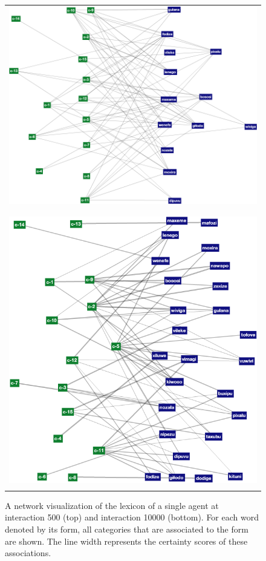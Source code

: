 \begin{figure}[p]
  \begin{tabular}{c}
    \includegraphics[scale=0.35]{figures/sfwm-lexicon-500} \\
    \\
    \\
    \includegraphics[scale=0.35]{figures/sfwm-lexicon-10000} \\
    \\
  \end{tabular}
  \caption{A network visualization of the lexicon of a single agent at
    interaction 500 (top) and interaction 10000 (bottom). For each
    word denoted by its form, all categories that are associated to
    the form are shown. The line width represents the certainty scores
    of these associations.  }
  \label{f:sfwm-semiotic-network}
\end{figure}

